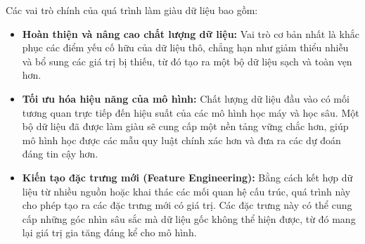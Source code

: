 Các vai trò chính của quá trình làm giàu dữ liệu bao gồm:
\begin{itemize}
    \item \textbf{Hoàn thiện và nâng cao chất lượng dữ liệu:} Vai trò cơ bản nhất là khắc phục các điểm yếu cố hữu của dữ liệu thô, chẳng hạn như giảm thiểu nhiễu và bổ sung các giá trị bị thiếu, từ đó tạo ra một bộ dữ liệu sạch và toàn vẹn hơn.
    
    \item \textbf{Tối ưu hóa hiệu năng của mô hình:} Chất lượng dữ liệu đầu vào có mối tương quan trực tiếp đến hiệu suất của các mô hình học máy và học sâu. Một bộ dữ liệu đã được làm giàu sẽ cung cấp một nền tảng vững chắc hơn, giúp mô hình học được các mẫu quy luật chính xác hơn và đưa ra các dự đoán đáng tin cậy hơn.
    
    \item \textbf{Kiến tạo đặc trưng mới (Feature Engineering):} Bằng cách kết hợp dữ liệu từ nhiều nguồn hoặc khai thác các mối quan hệ cấu trúc, quá trình này cho phép tạo ra các đặc trưng mới có giá trị. Các đặc trưng này có thể cung cấp những góc nhìn sâu sắc mà dữ liệu gốc không thể hiện được, từ đó mang lại giá trị gia tăng đáng kể cho mô hình.
\end{itemize}

